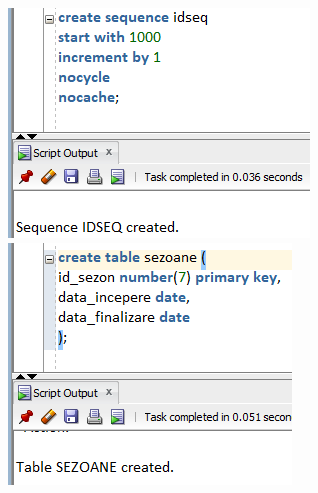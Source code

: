 \documentclass{article}
\begin{document}
\begin{multicols*}{4}
\includegraphics[width=\linewidth]{creation/sequence}
\vspace{4em}
\includegraphics[width=\linewidth]{creation/sezoane}
\vspace{4em}

\end{multicols*}
\end{document}
